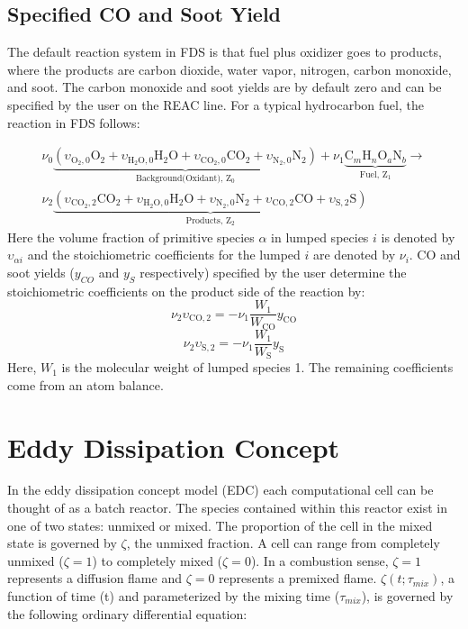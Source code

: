 \subsection{Specified CO and Soot Yield}
The default reaction system in FDS is that fuel plus oxidizer goes to products, where the products are carbon dioxide, water vapor, nitrogen, carbon monoxide, and soot. The carbon monoxide and soot yields are by default zero and can be specified by the user on the {\ct REAC} line. For a typical hydrocarbon fuel, the reaction in FDS follows:

\begin{eqnarray}
\nu_{0}\underbrace{(\upsilon_{\mathrm{O}_{2},0}\mathrm{O}_2+\upsilon_{\mathrm{H}_{2}\mathrm{O},0}\mathrm{H}_2\mathrm{O}+\upsilon_{\mathrm{CO}_{2},0}\mathrm{CO}_2+\upsilon_{\mathrm{N}_{2},0}\mathrm{N}_2)}_\text{Background(Oxidant),~Z$_0$}+\nu_{1}\underbrace{\mbox{C}_m\mbox{H}_n\mbox{O}_a\mbox{N}_b}_\text{Fuel,~Z$_1$} \rightarrow \\
\nonumber \nu_{2}\underbrace{(\upsilon_{\mathrm{CO}_{2},2}\mathrm{CO}_2+\upsilon_{\mathrm{H}_{2}\mathrm{O},0}\mathrm{H}_2\mathrm{O}+\upsilon_{\mathrm{N}_{2},0}\mathrm{N}_2+\upsilon_{\mathrm{CO},2}\mathrm{CO}+\upsilon_{\mathrm{S},2}\mathrm{S})}_\text{Products,~Z$_2$}
\end{eqnarray}
Here the volume fraction of primitive species $\alpha$ in lumped species $i$ is denoted by $\upsilon_{\alpha i}$ and the stoichiometric coefficients for the lumped $i$ are denoted by $\nu_{i}$. CO and soot yields ($y_{CO}$ and $y_{S}$ respectively) specified by the user determine the stoichiometric coefficients on the product side of the reaction by:
\begin{equation}\label{eq:co_yield}
\nu_{2}\upsilon_{\mathrm{CO},2}=-\nu_{1}\frac{W_1}{W_{\mathrm{CO}}}y_{\mathrm{CO}}
\end{equation}
\begin{equation}\label{eq:soot_yield}
\nu_{2}\upsilon_{\mathrm{S},2}=-\nu_{1}\frac{W_1}{W_{\mathrm{S}}}y_{\mathrm{S}}
\end{equation}
Here, $W_{1}$ is the molecular weight of lumped species 1. The remaining coefficients come from an atom balance.


\section{Eddy Dissipation Concept}
In the eddy dissipation concept model (EDC) each computational cell can be thought of as a batch reactor. The species contained within this reactor exist in one of two states: unmixed or mixed. The proportion of the cell in the mixed state is governed by $\zeta$, the unmixed fraction. A cell can range from completely unmixed ($\zeta=1$) to completely mixed ($\zeta=0$). In a combustion sense, $\zeta=1$  represents a diffusion flame and $\zeta=0$ represents a premixed flame. $\zeta(t;\tau_{mix})$, a function of time (t) and parameterized by the mixing time ($\tau_{mix}$), is governed by the following ordinary differential equation:

